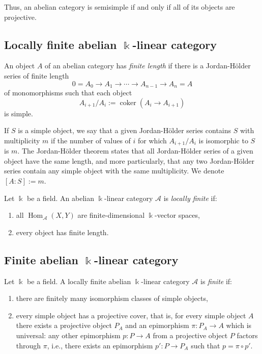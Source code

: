 \documentclass[11pt]{article}
\theoremstyle{definition}
\begin{document}
Thus, an abelian category is semisimple if and only if all of its objects are projective.




\subsection{Locally finite abelian \(\Bbbk\)-linear category}

An object \(A\) of an abelian category has \emph{finite length} if there is a Jordan-Hölder series of finite length
\[
0 = A_0 \to A_1 \to \cdots \to A_{n-1} \to A_n = A
\]
of monomorphisms such that each object
\[
A_{i+1}/A_i := \operatorname{coker}(A_i \to A_{i+1})
\]
is simple.

If \(S\) is a simple object, we say that a given Jordan-Hölder series contains \(S\) with multiplicity \(m\) if the number of values of \(i\) for which \(A_{i+1}/A_i\) is isomorphic to \(S\) is \(m\). The Jordan-Hölder theorem states that all Jordan-Hölder series of a given object have the same length, and more particularly, that any two Jordan-Hölder series contain any simple object with the same multiplicity. We denote \([A:S] := m\).

Let \(\Bbbk\) be a field. An abelian \(\Bbbk\)-linear category \(\mathcal{A}\) is \emph{locally finite} if:
\begin{enumerate}
    \item all \(\operatorname{Hom}_{\mathcal{A}}(X, Y)\) are finite-dimensional \(\Bbbk\)-vector spaces,
    \item every object has finite length.
\end{enumerate}

\subsection{Finite abelian \(\Bbbk\)-linear category}

Let \(\Bbbk\) be a field. A locally finite abelian \(\Bbbk\)-linear category \(\mathcal{A}\) is \emph{finite} if:
\begin{enumerate}
    \item there are finitely many isomorphism classes of simple objects,
    \item every simple object has a projective cover, that is, for every simple object \(A\) there exists a projective object \(P_A\) and an epimorphism \(\pi: P_A \to A\) which is universal: any other epimorphism \(p: P \to A\) from a projective object \(P\) factors through \(\pi\), i.e., there exists an epimorphism \(p': P \to P_A\) such that \(p = \pi \circ p'\).
\end{enumerate}
\end{document}
